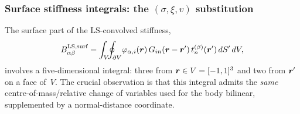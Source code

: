 \subsubsection*{Surface stiffness integrals: the
$(\sigma,\xi,v)$ substitution}

The surface part of the LS-convolved stiffness,
\begin{equation}
  B^{\text{LS,surf}}_{\alpha\beta}
  = \int_V\!\!\oint_{\partial V}\!\varphi_{\alpha,i}(\bm{r})\,
    G_{in}(\bm{r}-\bm{r}')\,t^{(\beta)}_n(\bm{r}')\,dS'\,dV,
  \label{eq:bstiff-surf-def}
\end{equation}
involves a five-dimensional integral: three from $\bm{r} \in V = [-1,1]^3$
and two from $\bm{r}'$ on a face of~$V$.  The crucial observation is that
this integral admits the \emph{same} centre-of-mass/relative change of
variables used for the body bilinear, supplemented by a normal-distance
coordinate.

